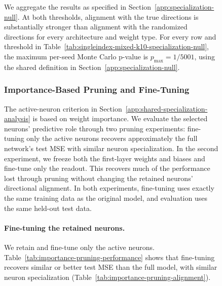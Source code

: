 \documentclass{article}
\newcounter{model}[section]
\begin{document}
\begin{figure}
We aggregate the results as specified in
Section~\ref{app:specialization-null}. At both thresholds, alignment with the true directions is
substantially stronger than alignment with the randomized directions for
every architecture and weight type.
For every row and threshold in
Table~\ref{tab:singleindex-mixed-k10-specialization-null}, the maximum
per-seed Monte Carlo p-value is \(p_{\max}=1/5001\), using the shared
definition in Section~\ref{app:specialization-null}.


\subsubsection{Importance-Based Pruning and Fine-Tuning}
\label{app:importance-pruning}

The active-neuron criterion in
Section~\ref{app:shared-specialization-analysis} is based on weight
importance. We evaluate the selected neurons' predictive role through two pruning
experiments: fine-tuning only the active neurons recovers approximately
the full network's test MSE with similar neuron specialization. In the
second experiment, we freeze both the first-layer weights and biases and
fine-tune only the readout. This recovers much of the performance lost
through pruning without changing the retained neurons' directional alignment.
In both experiments, fine-tuning uses exactly the same training data as
the original model, and evaluation uses the same held-out test data.

\paragraph{Fine-tuning the retained neurons.}
We retain and fine-tune only the active neurons.
Table~\ref{tab:importance-pruning-performance} shows that fine-tuning
recovers similar or better test MSE than the full model, with similar
neuron specialization (Table~\ref{tab:importance-pruning-alignment}).


\end{figure}
\end{document}
